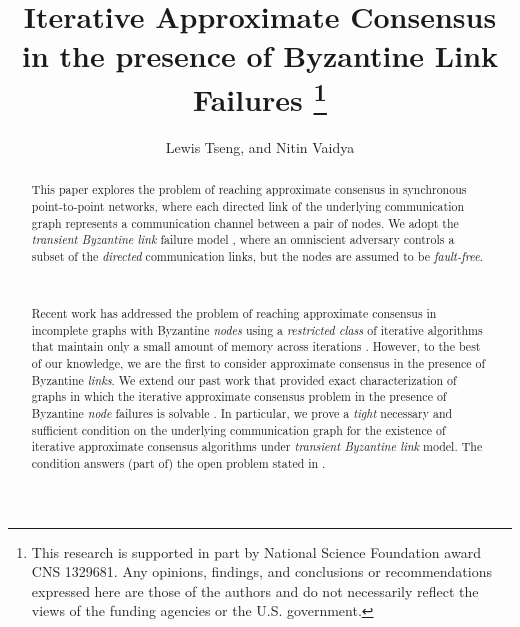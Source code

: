 \documentclass{llncs}
\begin{document}
\title{Iterative Approximate Consensus in the presence of Byzantine Link Failures
\thanks{\normalsize This research is supported in part by National Science Foundation award CNS 1329681. Any opinions, findings, and conclusions or recommendations expressed here are those of the authors and do not necessarily reflect the views of the funding agencies or the U.S. government.}}




\author{Lewis Tseng, and Nitin Vaidya}





\maketitle

\begin{abstract}{\normalfont
This paper explores the problem of reaching approximate consensus in synchronous point-to-point networks, where each directed link of the underlying communication graph represents a communication channel between a pair of nodes. We adopt the {\em transient Byzantine link} failure model \cite{Santoro_link,Santoro_link2}, where an omniscient adversary controls a subset of the {\em directed} communication links, but the nodes are assumed to be {\em fault-free}.

~

Recent work has addressed the problem of reaching approximate consensus in incomplete graphs with Byzantine {\em nodes} using a {\em restricted class} of iterative algorithms that maintain only a small amount of memory across iterations \cite{vaidya_PODC12,Tseng_general,vaidya_icdcn14,Sundaram_condition}. However, to the best of our knowledge, we are the first to consider approximate consensus in the presence of Byzantine {\em links}. We extend our past work that provided exact characterization of graphs in which the iterative approximate consensus problem in the presence of Byzantine {\em node} failures is solvable \cite{vaidya_PODC12,Tseng_general}. In particular, we prove a {\em tight} necessary and sufficient condition on the underlying communication graph for the existence of iterative approximate consensus algorithms under {\em transient Byzantine link} model. The condition answers (part of) the open problem stated in \cite{Santoro_link2}.
}
\end{abstract}
\end{document}
